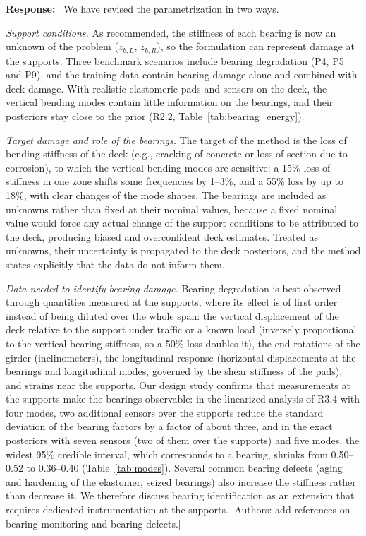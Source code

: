 \documentclass[11pt]{article}
\newenvironment{response}{\par\smallskip\noindent\color{resp}\textbf{Response:}\ }{\par}
\newcommand{\authornote}[1]{\textcolor{note}{\textsf{[Authors: #1]}}}
\begin{document}
\begin{response}
We have revised the parametrization in two ways.

\textit{Support conditions.} As recommended, the stiffness of each bearing is now an unknown of the problem
($z_{b,L}$, $z_{b,R}$), so the formulation can represent damage at the supports. Three benchmark scenarios include
bearing degradation (P4, P5 and P9), and the training data contain bearing damage alone and combined with deck damage.
With realistic elastomeric pads and sensors on the deck, the vertical bending modes contain little information on the
bearings, and their posteriors stay close to the prior (R2.2, Table~\ref{tab:bearing_energy}).

\textit{Target damage and role of the bearings.} The target of the method is the loss of bending stiffness of the deck
(e.g., cracking of concrete or loss of section due to corrosion), to which the vertical bending modes are sensitive: a
15\% loss of stiffness in one zone shifts some frequencies by 1--3\%, and a 55\% loss by up to 18\%, with clear
changes of the mode shapes. The bearings are
included as unknowns rather than fixed at their nominal values, because a fixed nominal value would force any actual
change of the support conditions to be attributed to the deck, producing biased and overconfident deck estimates.
Treated as unknowns, their uncertainty is propagated to the deck posteriors, and the method states explicitly that the
data do not inform them.

\textit{Data needed to identify bearing damage.} Bearing degradation is best observed through quantities measured at
the supports, where its effect is of first order instead of being diluted over the whole span: the vertical
displacement of the deck relative to the support under traffic or a known load (inversely proportional to the vertical
bearing stiffness, so a 50\% loss doubles it), the end rotations of the girder (inclinometers), the longitudinal
response (horizontal displacements at the bearings and longitudinal modes, governed by the shear stiffness of the
pads), and strains near the supports. Our design study confirms that measurements at the supports make the bearings
observable: in the linearized analysis of R3.4 with four modes, two additional sensors over the supports reduce the
standard deviation of the bearing factors by a factor of about three, and in the exact posteriors with seven sensors
(two of them over the supports) and five modes, the widest 95\% credible interval, which corresponds to a bearing,
shrinks from 0.50--0.52 to 0.36--0.40 (Table~\ref{tab:modes}). Several common bearing defects (aging and hardening of
the elastomer, seized bearings) also increase the stiffness rather than decrease it. We therefore discuss bearing
identification as an extension that requires dedicated instrumentation at the supports.
\authornote{add references on bearing monitoring and bearing defects.}


\end{response}
\end{document}
